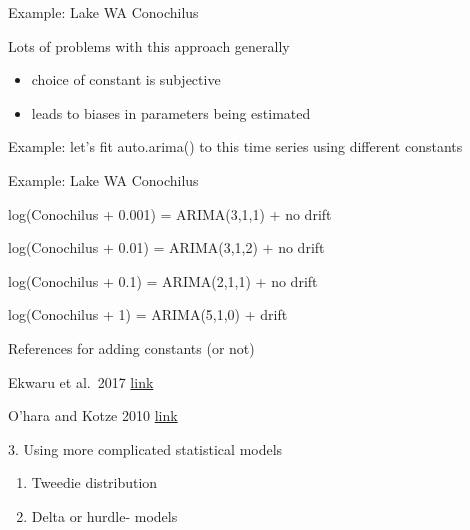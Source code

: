 \documentclass[ignorenonframetext,]{beamer}
\begin{document}
\begin{frame}{Example: Lake WA Conochilus}
\protect\hypertarget{example-lake-wa-conochilus-2}{}

Lots of problems with this approach generally

\begin{itemize}
\item
  choice of constant is subjective
\item
  leads to biases in parameters being estimated
\end{itemize}

Example: let's fit auto.arima() to this time series using different
constants

\end{frame}

\begin{frame}{Example: Lake WA Conochilus}
\protect\hypertarget{example-lake-wa-conochilus-3}{}

log(Conochilus + 0.001) = ARIMA(3,1,1) + no drift

log(Conochilus + 0.01) = ARIMA(3,1,2) + no drift

log(Conochilus + 0.1) = ARIMA(2,1,1) + no drift

log(Conochilus + 1) = ARIMA(5,1,0) + drift

\end{frame}

\begin{frame}{References for adding constants (or not)}
\protect\hypertarget{references-for-adding-constants-or-not}{}

Ekwaru et al.~2017
\href{https://amstat.tandfonline.com/doi/abs/10.1080/19466315.2017.1369900?journalCode=usbr20\#.XIe-RBNKiM4}{link}

O'hara and Kotze 2010
\href{https://besjournals.onlinelibrary.wiley.com/doi/full/10.1111/j.2041-210X.2010.00021.x}{link}

\end{frame}

\begin{frame}{3. Using more complicated statistical models}
\protect\hypertarget{using-more-complicated-statistical-models}{}

\begin{enumerate}
\item
  Tweedie distribution
\item
  Delta or hurdle- models
\end{enumerate}

\end{frame}
\end{document}
